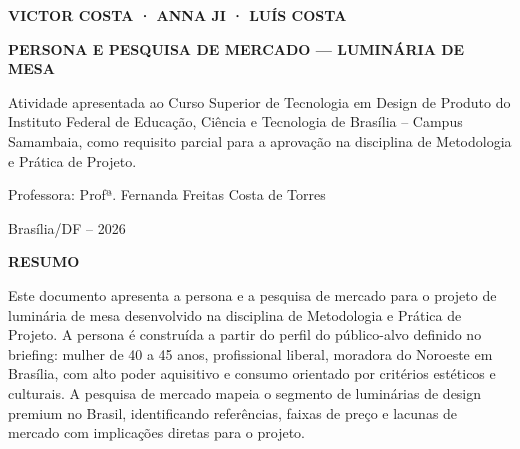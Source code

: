 \documentclass[
  12pt,
  a4paper,
  oneside,
  brazil
]{article}
\begin{document}
\begin{titlepage}
  \thispagestyle{empty}
  \begin{center}

    {\normalsize\bfseries VICTOR COSTA · ANNA JI · LUÍS COSTA}

    \vfill

    {\large\bfseries PERSONA E PESQUISA DE MERCADO --- LUMINÁRIA DE MESA}

    \vfill

    \begin{flushright}
      \begin{minipage}{0.5\textwidth}
        \normalsize
        Atividade apresentada ao Curso Superior de Tecnologia em Design de Produto
        do Instituto Federal de Educação, Ciência e Tecnologia de Brasília --
        Campus Samambaia, como requisito parcial para a aprovação na disciplina
        de Metodologia e Prática de Projeto.

        \vspace{1em}
        Professora: Profª. Fernanda Freitas Costa de Torres
      \end{minipage}
    \end{flushright}

    \vfill

    {\normalsize Brasília/DF -- 2026}

  \end{center}
\end{titlepage}

\clearpage
\thispagestyle{empty}
\begin{center}
  {\normalsize\bfseries RESUMO}
\end{center}

\vspace{1em}
\noindent
Este documento apresenta a persona e a pesquisa de mercado para o projeto de
luminária de mesa desenvolvido na disciplina de Metodologia e Prática de Projeto.
A persona é construída a partir do perfil do público-alvo definido no briefing:
mulher de 40 a 45 anos, profissional liberal, moradora do Noroeste em Brasília,
com alto poder aquisitivo e consumo orientado por critérios estéticos e culturais.
A pesquisa de mercado mapeia o segmento de luminárias de design premium no Brasil,
identificando referências, faixas de preço e lacunas de mercado com implicações
diretas para o projeto.
\end{document}
